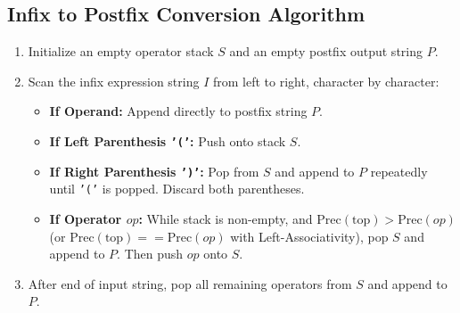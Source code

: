 \documentclass[12pt,a4paper]{article}
\begin{document}
\subsection{Infix to Postfix Conversion Algorithm}
\begin{tcolorbox}[defbox, title={\textbf{Shunting-Yard Infix to Postfix Algorithm}}]
\begin{enumerate}[leftmargin=*, nosep]
  \item Initialize an empty operator stack $S$ and an empty postfix output string $P$.
  \item Scan the infix expression string $I$ from left to right, character by character:
  \begin{itemize}[leftmargin=*, nosep]
    \item \textbf{If Operand:} Append directly to postfix string $P$.
    \item \textbf{If Left Parenthesis \texttt{'('}:} Push onto stack $S$.
    \item \textbf{If Right Parenthesis \texttt{')'}:} Pop from $S$ and append to $P$ repeatedly until \texttt{'('} is popped. Discard both parentheses.
    \item \textbf{If Operator $op$:} While stack is non-empty, and $\text{Prec}(\text{top}) > \text{Prec}(op)$ (or $\text{Prec}(\text{top}) == \text{Prec}(op)$ with Left-Associativity), pop $S$ and append to $P$. Then push $op$ onto $S$.
  \end{itemize}
  \item After end of input string, pop all remaining operators from $S$ and append to $P$.
\end{enumerate}
\end{tcolorbox}
\end{document}
